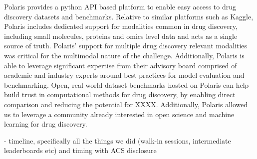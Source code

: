 \documentclass[journal=jacsat,manuscript=article]{achemso}
\begin{document}
 Polaris provides a python API based platform to enable easy access to drug discovery datasets and benchmarks. Relative to similar platforms such as Kaggle, Polaris includes dedicated support for modalities common in drug discovery, including small molecules, proteins and omics level data and acts as a single source of truth. Polaris' support for multiple drug discovery relevant modalities was critical for the multimodal nature of the challenge.  Additionally, Polaris is able to leverage significant expertise from their advisory board comprised of academic and industry experts around best practices for model evaluation and benchmarking. Open, real world dataset benchmarks hosted on Polaris can help build trust in computational methods for drug discovery, by enabling direct comparison and reducing the potential for XXXX. Additionally, Polaris allowed us to leverage a community already interested in open science and machine learning for drug discovery. 


- timeline, specifically all the things we did (walk-in sessions, intermediate leaderboards etc) and timing with ACS disclosure
\end{document}
